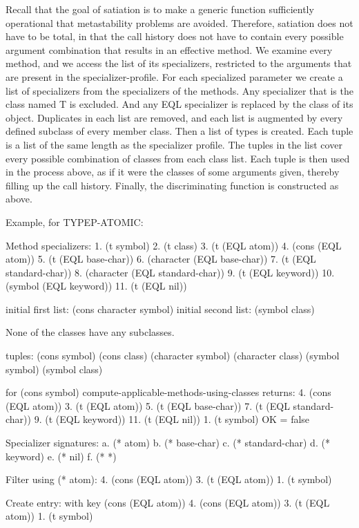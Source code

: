 Recall that the goal of satiation is to make a generic function
sufficiently operational that metastability problems are avoided.
Therefore, satiation does not have to be total, in that the call
history does not have to contain every possible argument combination
that results in an effective method.  We examine every method, and we
access the list of its specializers, restricted to the arguments that
are present in the specializer-profile.  For each specialized
parameter we create a list of specializers from the specializers of
the methods.  Any specializer that is the class named T is excluded.
And any EQL specializer is replaced by the class of its object.
Duplicates in each list are removed, and each list is augmented by
every defined subclass of every member class.  Then a list of types is
created.  Each tuple is a list of the same length as the specializer
profile.  The tuples in the list cover every possible combination of
classes from each class list.  Each tuple is then used in the process
above, as if it were the classes of some arguments given, thereby
filling up the call history. Finally, the discriminating function is
constructed as above.

Example, for TYPEP-ATOMIC:

Method specializers:
1.  (t symbol)
2.  (t class)
3.  (t (EQL atom))
4.  (cons (EQL atom))
5.  (t (EQL base-char))
6.  (character (EQL base-char))
7.  (t (EQL standard-char))
8.  (character (EQL standard-char))
9.  (t (EQL keyword))
10. (symbol (EQL keyword))
11. (t (EQL nil))

initial first list:
(cons character symbol)
initial second list:
(symbol class)

None of the classes have any subclasses.

tuples:
(cons symbol)
(cons class)
(character symbol)
(character class)
(symbol symbol)
(symbol class)

for (cons symbol)
   compute-applicable-methods-using-classes returns:
   4.  (cons (EQL atom))
   3.  (t (EQL atom))
   5.  (t (EQL base-char))
   7.  (t (EQL standard-char))
   9.  (t (EQL keyword))
   11. (t (EQL nil))
   1.  (t symbol)
   OK = false

   Specializer signatures:
   a. (* atom)
   b. (* base-char)
   c. (* standard-char)
   d. (* keyword)
   e. (* nil)
   f. (* *)

   Filter using (* atom):
   4.  (cons (EQL atom))
   3.  (t (EQL atom))
   1.  (t symbol)

   Create entry: with key (cons (EQL atom))
   4.  (cons (EQL atom))
   3.  (t (EQL atom))
   1.  (t symbol)

